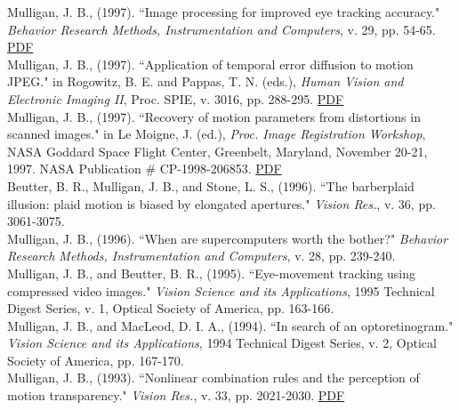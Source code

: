 \documentclass[12pt]{article}
\newcommand{\years}[1]{\marginnote{\scriptsize #1}}
\begin{document}
\clearpage
Mulligan, J. B., (1997).
``Image processing for improved eye tracking accuracy."
\emph{Behavior Research Methods, Instrumentation and Computers},
v. 29, pp. 54-65.  \href{https://hsi.arc.nasa.gov/publications/Mulligan_img_eye_track_accuracy.pdf}{PDF}\\

Mulligan, J. B., (1997).
``Application of temporal error diffusion to motion JPEG."
in Rogowitz, B. E. and Pappas, T. N. (eds.),
\emph{Human Vision and Electronic Imaging II},
Proc. SPIE, v. 3016,
pp. 288-295.  \href{http://hsi.arc.nasa.gov/publications/mulligan_spie97.pdf}{PDF}\\

Mulligan, J. B., (1997).
``Recovery of motion parameters from distortions in scanned images."
in Le Moigne, J. (ed.),
\emph{Proc. Image Registration Workshop},
NASA Goddard Space Flight Center, Greenbelt, Maryland, November 20-21, 1997.
NASA Publication \# CP-1998-206853.  \href{https://hsi.arc.nasa.gov/publications/mulligan_irw97.pdf}{PDF}\\

\years{1996}
Beutter, B. R., Mulligan, J. B., and Stone, L. S., (1996).
``The barberplaid illusion:  plaid motion is biased by elongated apertures."
\emph{Vision Res.}, v. 36, pp. 3061-3075.\\

Mulligan, J. B., (1996).
``When are supercomputers worth the bother?"
\emph{Behavior Research Methods, Instrumentation and Computers},
v. 28, pp. 239-240.\\

\years{1995}
Mulligan, J. B., and Beutter, B. R., (1995).
``Eye-movement tracking using compressed video images."
\emph{Vision Science and its Applications},
1995 Technical Digest Series,
v. 1,
Optical Society of America,
pp. 163-166.\\

\years{1994}
Mulligan, J. B., and MacLeod, D. I. A., (1994).
``In search of an optoretinogram."
\emph{Vision Science and its Applications},
1994 Technical Digest Series,
v. 2,
Optical Society of America,
pp. 167-170.\\

\years{1993}
Mulligan, J. B., (1993).
``Nonlinear combination rules and the perception of motion transparency."
\emph{Vision Res.},
v. 33, pp. 2021-2030.  \href{https://hsi.arc.nasa.gov/publications/Mulligan_nonlinear_combin.pdf}{PDF}\\
\end{document}
